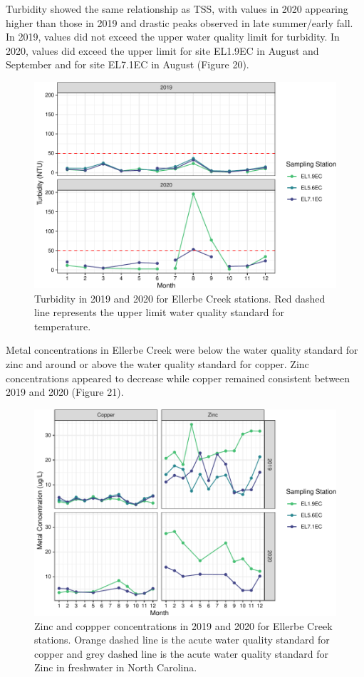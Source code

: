 \documentclass[
  12pt,
]{article}
\begin{document}
Turbidity showed the same relationship as TSS, with values in 2020
appearing higher than those in 2019 and drastic peaks observed in late
summer/early fall. In 2019, values did not exceed the upper water
quality limit for turbidity. In 2020, values did exceed the upper limit
for site EL1.9EC in August and September and for site EL7.1EC in August
(Figure 20).

\begin{figure}
\centering
\includegraphics{August_Lindborg_ENV872_Project_files/figure-latex/unnamed-chunk-21-1.pdf}
\caption{Turbidity in 2019 and 2020 for Ellerbe Creek stations. Red
dashed line represents the upper limit water quality standard for
temperature.}
\end{figure}

Metal concentrations in Ellerbe Creek were below the water quality
standard for zinc and around or above the water quality standard for
copper. Zinc concentrations appeared to decrease while copper remained
consistent between 2019 and 2020 (Figure 21).

\begin{figure}
\centering
\includegraphics{August_Lindborg_ENV872_Project_files/figure-latex/unnamed-chunk-22-1.pdf}
\caption{Zinc and coppper concentrations in 2019 and 2020 for Ellerbe
Creek stations. Orange dashed line is the acute water quality standard
for copper and grey dashed line is the acute water quality standard for
Zinc in freshwater in North Carolina.}
\end{figure}
\end{document}
